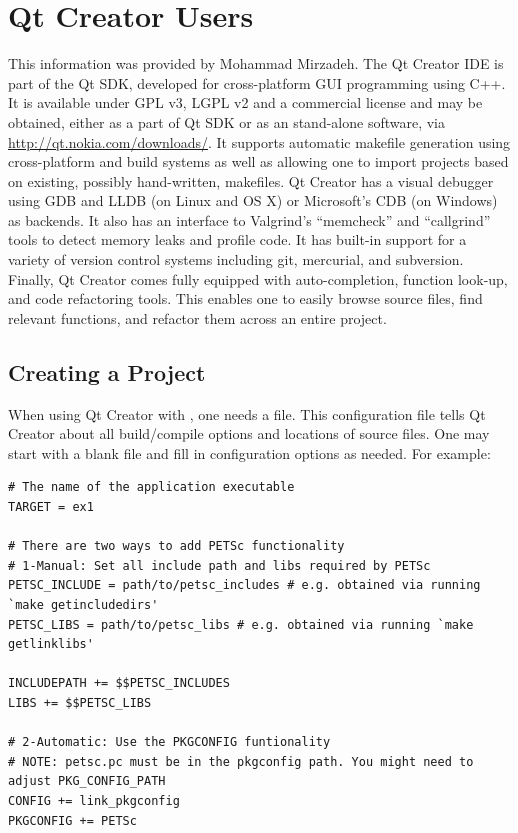 {{{\section{Qt Creator Users} 
This information was provided by Mohammad Mirzadeh.
The Qt Creator IDE is part of the Qt SDK, developed for cross-platform GUI programming using C++.
It is available under GPL v3, LGPL v2 and a commercial license and may be obtained, either as a
part of Qt SDK or as an stand-alone software, via \url{http://qt.nokia.com/downloads/}.
It supports automatic makefile generation using cross-platform  and 
build systems as well as allowing one to import projects based on existing, possibly hand-written, makefiles.
Qt Creator has a visual debugger using GDB and LLDB (on Linux and OS X) or Microsoft's
CDB (on Windows) as backends. It also has an interface to Valgrind's ``memcheck'' and ``callgrind''
tools to detect memory leaks and profile code. It has built-in support for a variety of version
control systems including git, mercurial, and subversion. Finally, Qt Creator comes fully equipped with
auto-completion, function look-up, and code refactoring tools. This enables one to easily browse source
files, find relevant functions, and refactor them across an entire project.

\subsection*{Creating a Project}
When using Qt Creator with , one needs a  file. This configuration file
tells Qt Creator about all build/compile options and locations of source files. One may start with
a blank  file and fill in configuration options as needed. For example:
\begin{lstlisting}
# The name of the application executable
TARGET = ex1

# There are two ways to add PETSc functionality
# 1-Manual: Set all include path and libs required by PETSc
PETSC_INCLUDE = path/to/petsc_includes # e.g. obtained via running `make getincludedirs'
PETSC_LIBS = path/to/petsc_libs # e.g. obtained via running `make getlinklibs'

INCLUDEPATH += $$PETSC_INCLUDES
LIBS += $$PETSC_LIBS

# 2-Automatic: Use the PKGCONFIG funtionality
# NOTE: petsc.pc must be in the pkgconfig path. You might need to adjust PKG_CONFIG_PATH
CONFIG += link_pkgconfig
PKGCONFIG += PETSc


\end{lstlisting}}}}
